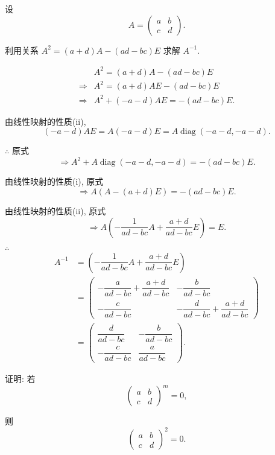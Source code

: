 \documentclass{ctexart}
\begin{document}
\begin{exercise}[3.14]
    设
    \[A=\begin{pmatrix}
        a & b \\
        c & d
    \end{pmatrix}.\]
    
    利用关系 $A^2=(a+d)A-(ad-bc)E$ 求解 $A^{-1}$.
\end{exercise}
\begin{solution}
    \begin{align*}
        & A^2=(a+d)A-(ad-bc)E \\
        \Rightarrow & A^2=(a+d)AE-(ad-bc)E \\
        \Rightarrow & A^2+(-a-d)AE=-(ad-bc)E.
    \end{align*}

    由线性映射的性质(ii),
    \[(-a-d)AE=A(-a-d)E=A\operatorname{diag}(-a-d,-a-d).\]

    $\therefore$ 原式
    \[\Rightarrow A^2+A\operatorname{diag}(-a-d,-a-d)=-(ad-bc)E.\]

    由线性映射的性质(i), 原式
    \[\Rightarrow A(A-(a+d)E)=-(ad-bc)E.\]

    由线性映射的性质(ii), 原式
    \[\Rightarrow A\left(-\dfrac{1}{ad-bc}A+\dfrac{a+d}{ad-bc}E\right)=E.\]

    $\therefore$
    \begin{align*}
        A^{-1} & =\left(-\dfrac{1}{ad-bc}A+\dfrac{a+d}{ad-bc}E\right) \\
        & =\begin{pmatrix}
            -\dfrac{a}{ad-bc}+\dfrac{a+d}{ad-bc} & -\dfrac{b}{ad-bc} \\[8pt]
            -\dfrac{c}{ad-bc} & -\dfrac{d}{ad-bc}+\dfrac{a+d}{ad-bc}
        \end{pmatrix} \\
        & =\begin{pmatrix}
            \dfrac{d}{ad-bc} & -\dfrac{b}{ad-bc} \\[8pt]
            -\dfrac{c}{ad-bc} & \dfrac{a}{ad-bc}
        \end{pmatrix}.
    \end{align*}
\end{solution}
\begin{exercise}[3.16]
    证明: 若
    \[\begin{pmatrix}
        a & b \\
        c & d
    \end{pmatrix}^m=0,\]

    则
    \[\begin{pmatrix}
        a & b \\
        c & d
    \end{pmatrix}^2=0.\]
\end{exercise}
\end{document}
